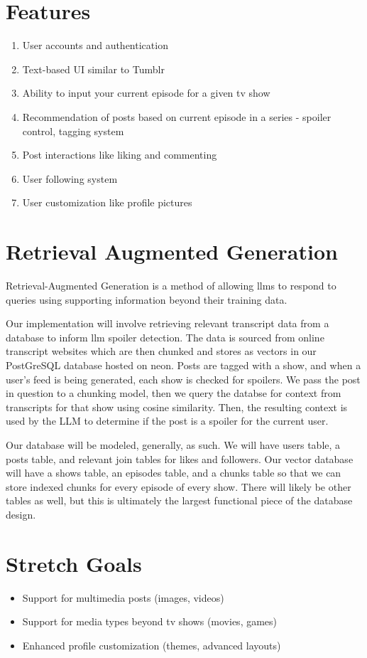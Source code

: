 \documentclass{homework}
\begin{document}
\section{Features}
\begin{enumerate}
  \item User accounts and authentication
  \item Text-based UI similar to Tumblr
  \item Ability to input your current episode for a given tv show
  \item Recommendation of posts based on current episode in a series - spoiler control, tagging system
  \item Post interactions like liking and commenting
  \item User following system
  \item User customization like profile pictures
\end{enumerate}

\section{Retrieval Augmented Generation}\label{rag:exp}

Retrieval-Augmented Generation is a method of allowing llms to respond to queries using supporting information beyond their training data. 

Our implementation will involve retrieving relevant transcript data from a database to inform llm spoiler detection. The data is sourced from online transcript websites which are then chunked and stores as vectors in our PostGreSQL database hosted on neon. Posts are tagged with a show, and when a user's feed is being generated, each show is checked for spoilers. We pass the post in question to a chunking model, then we query the databse for context from transcripts for that show using cosine similarity. Then, the resulting context is used by the LLM to determine if the post is a spoiler for the current user. 

Our database will be modeled, generally, as such. We will have users table, a posts table, and relevant join tables for likes and followers. Our vector database will have a shows table, an episodes table, and a chunks table so that we can store indexed chunks for every episode of every show. There will likely be other tables as well, but this is ultimately the largest functional piece of the database design. 

\section{Stretch Goals}
\begin{itemize}
  \item Support for multimedia posts (images, videos)
  \item Support for media types beyond tv shows (movies, games)
  \item Enhanced profile customization (themes, advanced layouts)
\end{itemize}

% 
% 
\end{document}
